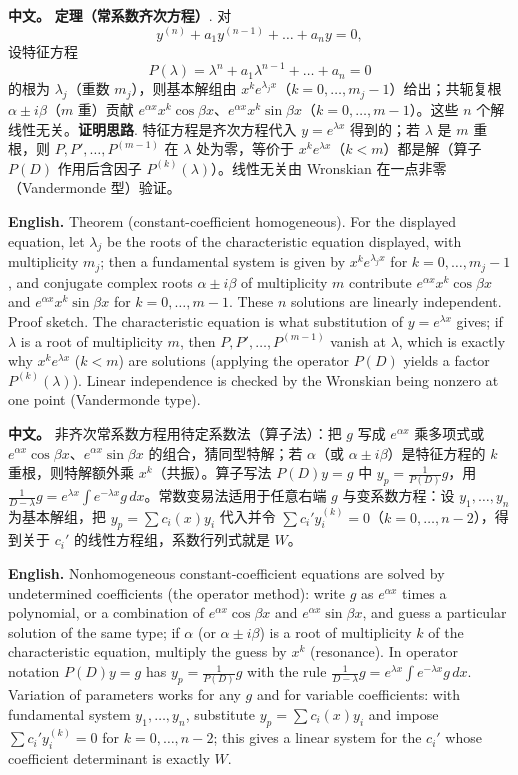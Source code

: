 \documentclass[UTF8,11pt,a4paper]{ctexart}
\newcommand{\APS}[2]{\par\noindent\textbf{中文。} #1\par\noindent\textbf{English.} #2\par}
\begin{document}
\APS{\textbf{定理（常系数齐次方程）}. 对
\[
y^{(n)}+a_1y^{(n-1)}+\dots+a_ny=0,
\]
设特征方程
\[
P(\lambda)=\lambda^n+a_1\lambda^{n-1}+\dots+a_n=0
\]
的根为 $\lambda_j$（重数 $m_j$），则基本解组由 $x^{k}e^{\lambda_jx}$（$k=0,\dots,m_j-1$）给出；共轭复根 $\alpha\pm i\beta$（$m$ 重）贡献 $e^{\alpha x}x^k\cos\beta x$、$e^{\alpha x}x^k\sin\beta x$（$k=0,\dots,m-1$）。这些 $n$ 个解线性无关。\textbf{证明思路}. 特征方程是齐次方程代入 $y=e^{\lambda x}$ 得到的；若 $\lambda$ 是 $m$ 重根，则 $P,P',\dots,P^{(m-1)}$ 在 $\lambda$ 处为零，等价于 $x^ke^{\lambda x}$（$k<m$）都是解（算子 $P(D)$ 作用后含因子 $P^{(k)}(\lambda)$）。线性无关由 Wronskian 在一点非零（Vandermonde 型）验证。}{Theorem (constant-coefficient homogeneous). For the displayed equation, let $\lambda_j$ be the roots of the characteristic equation displayed, with multiplicity $m_j$; then a fundamental system is given by $x^{k}e^{\lambda_jx}$ for $k=0,\dots,m_j-1$, and conjugate complex roots $\alpha\pm i\beta$ of multiplicity $m$ contribute $e^{\alpha x}x^k\cos\beta x$ and $e^{\alpha x}x^k\sin\beta x$ for $k=0,\dots,m-1$. These $n$ solutions are linearly independent. Proof sketch. The characteristic equation is what substitution of $y=e^{\lambda x}$ gives; if $\lambda$ is a root of multiplicity $m$, then $P,P',\dots,P^{(m-1)}$ vanish at $\lambda$, which is exactly why $x^ke^{\lambda x}$ ($k<m$) are solutions (applying the operator $P(D)$ yields a factor $P^{(k)}(\lambda)$). Linear independence is checked by the Wronskian being nonzero at one point (Vandermonde type).}
\APS{非齐次常系数方程用待定系数法（算子法）：把 $g$ 写成 $e^{\alpha x}$ 乘多项式或 $e^{\alpha x}\cos\beta x$、$e^{\alpha x}\sin\beta x$ 的组合，猜同型特解；若 $\alpha$（或 $\alpha\pm i\beta$）是特征方程的 $k$ 重根，则特解额外乘 $x^k$（共振）。算子写法 $P(D)y=g$ 中 $y_p=\frac{1}{P(D)}g$，用 $\frac{1}{D-\lambda}g=e^{\lambda x}\int e^{-\lambda x}g\,dx$。常数变易法适用于任意右端 $g$ 与变系数方程：设 $y_1,\dots,y_n$ 为基本解组，把 $y_p=\sum c_i(x)y_i$ 代入并令 $\sum c_i'y_i^{(k)}=0$（$k=0,\dots,n-2$），得到关于 $c_i'$ 的线性方程组，系数行列式就是 $W$。}{Nonhomogeneous constant-coefficient equations are solved by undetermined coefficients (the operator method): write $g$ as $e^{\alpha x}$ times a polynomial, or a combination of $e^{\alpha x}\cos\beta x$ and $e^{\alpha x}\sin\beta x$, and guess a particular solution of the same type; if $\alpha$ (or $\alpha\pm i\beta$) is a root of multiplicity $k$ of the characteristic equation, multiply the guess by $x^k$ (resonance). In operator notation $P(D)y=g$ has $y_p=\frac{1}{P(D)}g$ with the rule $\frac{1}{D-\lambda}g=e^{\lambda x}\int e^{-\lambda x}g\,dx$. Variation of parameters works for any $g$ and for variable coefficients: with fundamental system $y_1,\dots,y_n$, substitute $y_p=\sum c_i(x)y_i$ and impose $\sum c_i'y_i^{(k)}=0$ for $k=0,\dots,n-2$; this gives a linear system for the $c_i'$ whose coefficient determinant is exactly $W$.}
\end{document}
